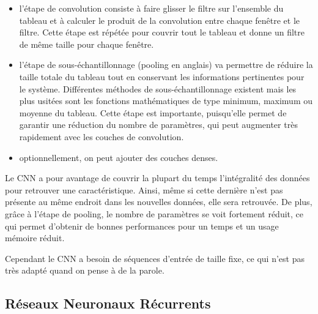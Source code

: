 \begin{itemize}
  \item l'étape de convolution consiste à faire glisser le filtre sur l'ensemble du tableau et à calculer le produit de la convolution entre chaque fenêtre et le filtre. Cette étape est répétée pour couvrir tout le tableau et donne un filtre de même taille pour chaque fenêtre.
  \item l'étape de sous-échantillonnage (pooling en anglais) va permettre de réduire la taille totale du tableau tout en conservant les informations pertinentes pour le système. Différentes méthodes de sous-échantillonnage existent mais les plus usitées sont les fonctions mathématiques de type minimum, maximum ou moyenne du tableau. Cette étape est importante, puisqu'elle permet de garantir une réduction du nombre de paramètres, qui peut augmenter très rapidement avec les couches de convolution.
  \item optionnellement, on peut ajouter des couches denses.%
\end{itemize}


Le CNN a pour avantage de couvrir la plupart du temps l'intégralité des données pour retrouver une caractéristique. Ainsi, même si cette dernière n'est pas présente au même endroit dans les nouvelles données, elle sera retrouvée. De plus, grâce à l'étape de pooling, le nombre de paramètres se voit fortement réduit, ce qui permet d'obtenir de bonnes performances pour un temps et un usage mémoire réduit.

Cependant le CNN %
a besoin de séquences d'entrée de taille fixe, ce qui n'est pas très adapté quand on pense à de la parole.

\subsection{Réseaux Neuronaux Récurrents}


